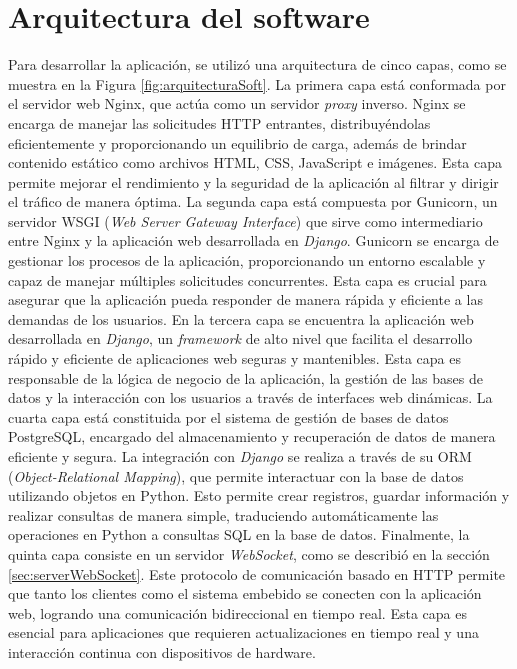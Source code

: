 \section{Arquitectura del software}
Para desarrollar la aplicación, se utilizó una arquitectura de cinco capas, como se muestra en la Figura \ref{fig:arquitecturaSoft}. La primera capa está conformada por el servidor web Nginx, que actúa como un servidor \textit{proxy} inverso. Nginx se encarga de manejar las solicitudes HTTP entrantes, distribuyéndolas eficientemente y proporcionando un equilibrio de carga, además de brindar contenido estático como archivos HTML, CSS, JavaScript e imágenes. Esta capa permite mejorar el rendimiento y la seguridad de la aplicación al filtrar y dirigir el tráfico de manera óptima. La segunda capa está compuesta por Gunicorn, un servidor WSGI (\textit{Web Server Gateway Interface}) que sirve como intermediario entre Nginx y la aplicación web desarrollada en \textit{Django}. Gunicorn se encarga de gestionar los procesos de la aplicación, proporcionando un entorno escalable y capaz de manejar múltiples solicitudes concurrentes. Esta capa es crucial para asegurar que la aplicación pueda responder de manera rápida y eficiente a las demandas de los usuarios. En la tercera capa se encuentra la aplicación web desarrollada en \textit{Django}, un \textit{framework} de alto nivel que facilita el desarrollo rápido y eficiente de aplicaciones web seguras y mantenibles.  Esta capa es responsable de la lógica de negocio de la aplicación, la gestión de las bases de datos y la interacción con los usuarios a través de interfaces web dinámicas. La cuarta capa está constituida por el sistema de gestión de bases de datos PostgreSQL, encargado del almacenamiento y recuperación de datos de manera eficiente y segura. La integración con \textit{Django} se realiza a través de su ORM (\textit{Object-Relational Mapping}), que permite interactuar con la base de datos utilizando objetos en Python. Esto permite crear registros, guardar información y realizar consultas de manera simple, traduciendo automáticamente las operaciones en Python a consultas SQL en la base de datos. Finalmente, la quinta capa consiste en un servidor \textit{WebSocket}, como se describió en la sección \ref{sec:serverWebSocket}. Este protocolo de comunicación basado en HTTP permite que tanto los clientes como el sistema embebido se conecten con la aplicación web, logrando una comunicación bidireccional en tiempo real. Esta capa es esencial para aplicaciones que requieren actualizaciones en tiempo real y una interacción continua con dispositivos de hardware.

